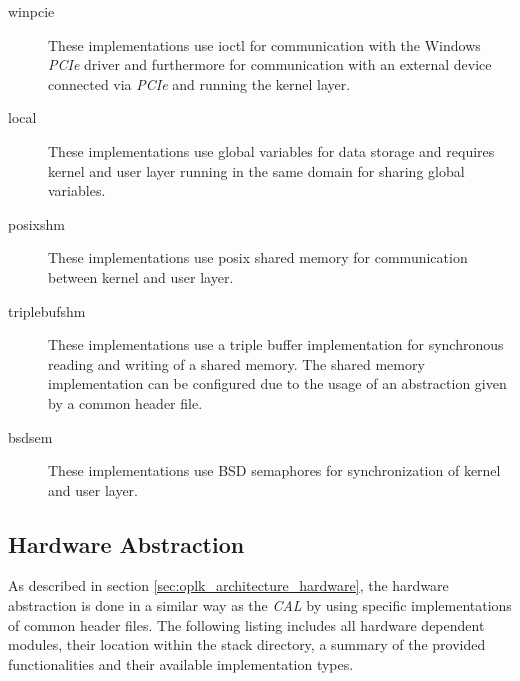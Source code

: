 \begin{description}
    \item[winpcie] These implementations use ioctl for communication with the Windows \emph{PCIe} driver and furthermore for communication with an external device connected via \emph{PCIe} and running the kernel layer.
    \item[local] These implementations use global variables for data storage and requires kernel and user layer running in the same domain for sharing global variables.
    \item[posixshm] These implementations use posix shared memory for communication between kernel and user layer.
    \item[triplebufshm] These implementations use a triple buffer implementation for synchronous reading and writing of a shared memory.
    The shared memory implementation can be configured due to the usage of an abstraction given by a common header file.
    \item[bsdsem] These implementations use BSD semaphores for synchronization of kernel and user layer.
\end{description}



\subsection{Hardware Abstraction}
\label{sec:oplk_platform_hardware}

As described in section \ref{sec:oplk_architecture_hardware}, the hardware abstraction is done in a similar way as the \emph{CAL} by using specific implementations of common header files.
The following listing includes all hardware dependent modules, their location within the stack directory, a summary of the provided functionalities and their available implementation types.

